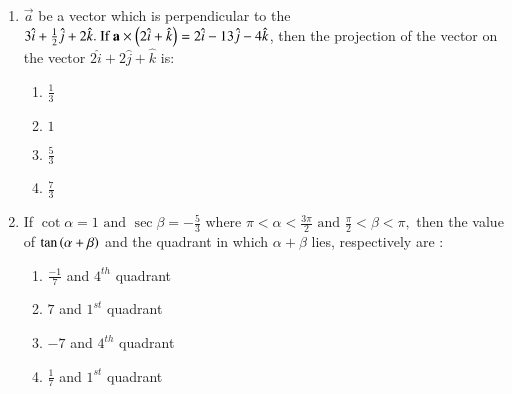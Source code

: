 \documentclass[journal]{IEEEtran}
\theoremstyle{remark}
\begin{document}
\begin{enumerate}[start=11]
\item   
 $\vec{a}$ be a vector which is perpendicular to the  $3\hat{i} + \frac{1}{2}\hat{j} + 2\hat{k}.  \text{ If }  \mathbf{a} \times \left(2\hat{i} + \hat{k}\right) = 2\hat{i} - 13\hat{j} - 4\hat{k}$, then the projection of the vector on the vector
$2\hat{i} + 2\hat{j} + \hat{k} $ is: 

\hfill{}


\begin{multicols}{4}
\begin{enumerate}
\item $\frac{1}{3}$
\item $1$
\item $\frac{5}{3}$
\item $\frac{7}{3}$
\end{enumerate}
\end{multicols}

\item  If
$\cot{\alpha} = 1   \text{ and }   \sec{\beta} = -\frac{5}{3} \text{ where }   \pi < \alpha < \frac{3\pi}{2}   \text{ and }   \frac{\pi}{2} < \beta < \pi,$ then the value of $\tan \left(\alpha + \beta\right)$ and the quadrant in which $\alpha + \beta$ lies, respectively are :

\hfill{}


\begin{multicols}{2}
\begin{enumerate}
\item $\frac{-1}{7} $ and $4^{th}$ quadrant
\item $7 $ and $1^{st}$ quadrant
\item $-7$ and $4^{th}$ quadrant
\item $\frac{1}{7} $ and $1^{st}$ quadrant
\end{enumerate}
\end{multicols}

\end{enumerate}
\end{document}
